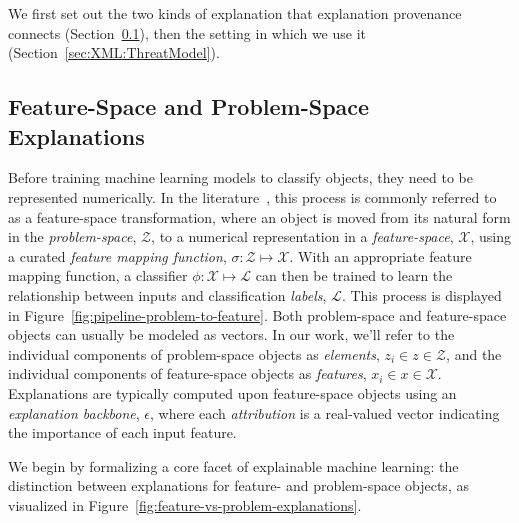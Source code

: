 
We first set out the two kinds of explanation that explanation provenance connects (Section~\ref{sec:XML:Spaces}), then the setting in which we use it (Section~\ref{sec:XML:ThreatModel}).

\subsection{Feature-Space and Problem-Space Explanations}
\label{sec:XML:Spaces}
Before training machine learning models to classify objects, they need to be represented numerically. In the literature~\cite{pierazzi2020intriguing}, this process is commonly referred to as a feature-space transformation, where an object is moved from its natural form in the \textit{problem-space}, $\mathcal{Z}$, to a numerical representation in a \textit{feature-space}, $\mathcal{X}$, using a curated \textit{feature mapping function}, $\sigma: \mathcal{Z} \mapsto \mathcal{X}$. With an appropriate feature mapping function, a classifier $\phi: \mathcal{X} \mapsto \mathcal{L}$ can then be trained to learn the relationship between inputs and classification \textit{labels}, $\mathcal{L}$. This process is displayed in Figure~\ref{fig:pipeline-problem-to-feature}. Both problem-space and feature-space objects can usually be modeled as vectors. In our work, we'll refer to the individual components of problem-space objects as \textit{elements}, $z_i \in z \in \mathcal{Z}$, and the individual components of feature-space objects as \textit{features}, $x_i \in x \in \mathcal{X}$. Explanations are typically computed upon feature-space objects using an \textit{explanation backbone}, $\epsilon$, where each \textit{attribution} is a real-valued vector indicating the importance of each input feature.




We begin by formalizing a core facet of explainable machine learning: the distinction between explanations for feature- and problem-space objects, as visualized in Figure~\ref{fig:feature-vs-problem-explanations}.




